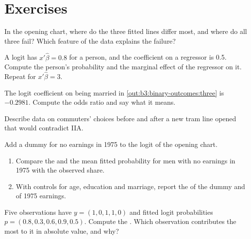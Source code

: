 \section{Exercises}\label{sec:b3:binary-outcomes:exercises}

\begin{exercise}[$\star$]\label{exo:b3:binary-outcomes:1}
In the opening chart, where do the three fitted lines differ most, and where do
all three fail? Which feature of the data explains the failure?
\end{exercise}

\begin{exercise}[$\star$]\label{exo:b3:binary-outcomes:2}
A logit has $x'\hat\beta = 0.8$ for a person, and the coefficient on a regressor
is 0.5. Compute the person's probability and the marginal effect of the
regressor on it. Repeat for $x'\hat\beta = 3$.
\end{exercise}

\begin{exercise}[$\star$]\label{exo:b3:binary-outcomes:3}
The logit coefficient on being married in \cref{out:b3:binary-outcomes:three}
is $-0.2981$. Compute the odds ratio and say what it means.
\end{exercise}

\begin{exercise}[$\star$]\label{exo:b3:binary-outcomes:4}
Describe data on commuters' choices before and after a new tram line opened
that would contradict IIA.
\end{exercise}

\begin{exercise}[$\star\star$]\label{exo:b3:binary-outcomes:5}
Add a dummy for no earnings in 1975 to the logit of the opening chart.
\begin{enumerate}
\item Compare the  and the mean fitted probability for men with no
earnings in 1975 with the observed share.
\item With controls for age, education and marriage, report the  of the dummy and of 1975 earnings.
\end{enumerate}
\end{exercise}

\begin{exercise}[$\star\star$]\label{exo:b3:binary-outcomes:6}
Five observations have $y = (1, 0, 1, 1, 0)$ and fitted logit probabilities
$p = (0.8, 0.3, 0.6, 0.9, 0.5)$. Compute the . Which observation
contributes the most to it in absolute value, and why?
\end{exercise}

